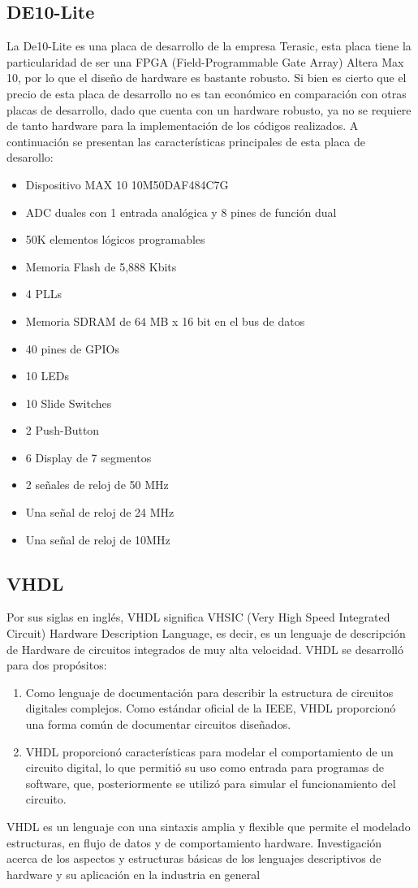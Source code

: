 \documentclass{article}
\begin{document}
\subsection{DE10-Lite}
La De10-Lite es una placa de desarrollo de la empresa Terasic, esta placa tiene la particularidad de ser una FPGA (Field-Programmable Gate Array) Altera Max 10, por lo que el diseño de hardware es bastante robusto. Si bien es cierto que el precio de esta placa de desarrollo no es tan económico en comparación con otras placas de desarrollo, dado que cuenta con un hardware robusto, ya no se requiere de tanto hardware para la implementación de los códigos realizados. A continuación se presentan las características principales de esta placa de desarollo: 
\begin{itemize}
    \item Dispositivo MAX 10 10M50DAF484C7G
    \item ADC duales con 1 entrada analógica y 8 pines de función dual
    \item 50K elementos lógicos programables
    \item Memoria Flash de 5,888 Kbits
    \item 4 PLLs
    \item Memoria SDRAM de 64 MB x 16 bit en el bus de datos
    \item 40 pines de GPIOs
    \item 10 LEDs
    \item 10 Slide Switches
    \item 2 Push-Button 
    \item 6 Display de 7 segmentos
    \item 2 señales de reloj de 50 MHz
    \item Una señal de reloj de 24 MHz
    \item Una señal de reloj de 10MHz
\end{itemize}
\subsection{VHDL}
Por sus siglas en inglés, VHDL significa VHSIC (Very High Speed Integrated Circuit) Hardware Description Language, es decir, es un lenguaje de descripción de Hardware de circuitos integrados de muy alta velocidad. VHDL se desarrolló para dos propósitos:
\begin{enumerate}
    \item Como lenguaje de documentación para describir la estructura de circuitos digitales complejos. Como estándar oficial de la IEEE, VHDL proporcionó una forma común de documentar circuitos diseñados.
    \item VHDL proporcionó características para modelar el comportamiento de un circuito digital, lo que permitió su uso como entrada para programas de software, que, posteriormente se utilizó para simular el funcionamiento del circuito.
\end{enumerate}
VHDL es un lenguaje con una sintaxis amplia y flexible que permite el modelado estructuras, en flujo de datos y de comportamiento hardware.
Investigación acerca de los aspectos y estructuras básicas de los lenguajes descriptivos de hardware y su aplicación en la industria en general
\end{document}
